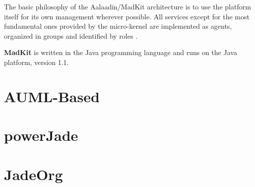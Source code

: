 The basic philosophy of the Aalaadin/MadKit architecture is to use the platform itself for its own management wherever possible.
All services except for the most fundamental ones provided by the micro-kernel are implemented as agents, organized in groups and identified by roles \cite{Ferber98}.

\textbf{MadKit} is written in the Java programming language and runs on the Java platform, version 1.1.

\section{AUML-Based}

\section{powerJade}

\section{JadeOrg}